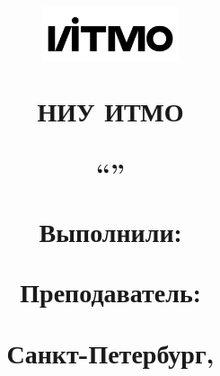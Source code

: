 \begin{titlepage}

\thispagestyle{empty}

\title{

\includegraphics[width=4cm]{media/ITMO_logo.png} 

\vspace{1em}
НИУ ИТМО 
\vspace{4em}

\begin{center}
\large\textsc{\textbf{\name}}

\vspace{1em}
``\subname'' 

\end{center}

\vspace{3em}

\begin{flushright}
\normalsize{ 
Выполнили: \\ \textbf{\madeby} 

Преподаватель: \\ \textbf{\teacher} 
}
\end{flushright}	

\vfill

\begin{center}
\small{Санкт-Петербург, \the\year}
\end{center}
}


\author{}
\date{}
\maketitle
\thispagestyle{empty}
\end{titlepage}